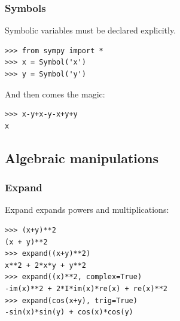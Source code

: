 \documentclass[10pt,colorlinks]{beamer}
\begin{document}
\begin{frame}[fragile]\frametitle{Symbols}
Symbolic variables must be declared explicitly. 
\begin{verbatim}
>>> from sympy import *
>>> x = Symbol('x')
>>> y = Symbol('y')
\end{verbatim}

And then comes the magic:
\begin{verbatim}
>>> x-y+x-y-x+y+y
x
\end{verbatim}

\end{frame}

\subsection{Algebraic manipulations} %
\label{sub:Algebraic manipulations}
\begin{frame}[fragile]\frametitle{Expand}
Expand expands powers and multiplications: 
\begin{verbatim}
>>> (x+y)**2
(x + y)**2
>>> expand((x+y)**2)
x**2 + 2*x*y + y**2
>>> expand((x)**2, complex=True)
-im(x)**2 + 2*I*im(x)*re(x) + re(x)**2
>>> expand(cos(x+y), trig=True)
-sin(x)*sin(y) + cos(x)*cos(y)
\end{verbatim}

\end{frame}
\end{document}
